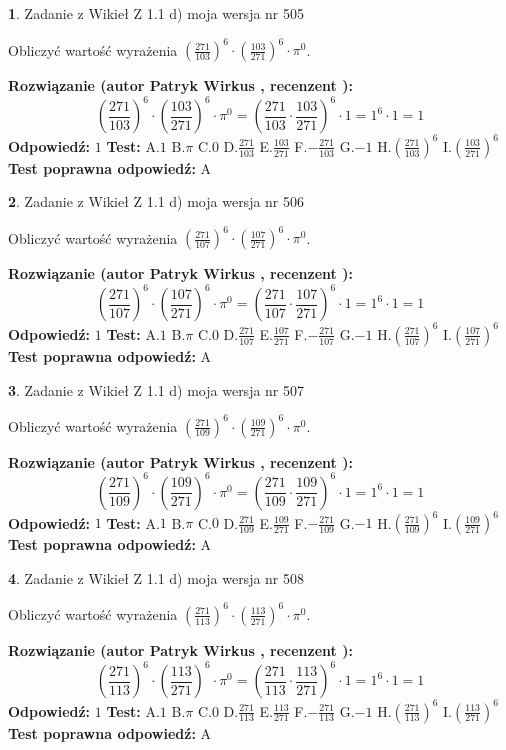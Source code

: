 \documentclass[12pt, a4paper]{article}
\theoremstyle{definition} %
\newtheorem{zad}{}
\newcommand{\zadStart}[1]{\begin{zad}#1\newline}
\newcommand{\zadStop}{\end{zad}}
\newcommand{\rozwStart}[2]{\noindent \textbf{Rozwiązanie (autor #1 , recenzent #2): }\newline}
\newcommand{\rozwStop}{\newline}
\newcommand{\odpStart}{\noindent \textbf{Odpowiedź:}\newline}
\newcommand{\odpStop}{\newline}
\newcommand{\testStart}{\noindent \textbf{Test:}\newline}
\newcommand{\testStop}{\newline}
\newcommand{\kluczStart}{\noindent \textbf{Test poprawna odpowiedź:}\newline}
\newcommand{\kluczStop}{\newline}
\begin{document}
\zadStart{Zadanie z Wikieł Z 1.1 d) moja wersja nr 505}

Obliczyć wartość wyrażenia $(\frac{271}{103})^{6} \cdot (\frac{103}{271})^{6} \cdot \pi^{0}$.
\zadStop
\rozwStart{Patryk Wirkus}{}
$$(\frac{271}{103})^{6} \cdot (\frac{103}{271})^{6} \cdot \pi^{0} = (\frac{271}{103} \cdot \frac{103}{271})^{6} \cdot 1 = 1^{6} \cdot 1 = 1$$
\rozwStop
\odpStart
$1$
\odpStop
\testStart
A.$1$ B.$\pi$ C.$0$ D.$\frac{271}{103}$ E.$\frac{103}{271}$
F.$-\frac{271}{103}$ G.$-1$
H.$(\frac{271}{103})^{6}$
I.$(\frac{103}{271})^{6}$
\testStop
\kluczStart
A
\kluczStop



\zadStart{Zadanie z Wikieł Z 1.1 d) moja wersja nr 506}

Obliczyć wartość wyrażenia $(\frac{271}{107})^{6} \cdot (\frac{107}{271})^{6} \cdot \pi^{0}$.
\zadStop
\rozwStart{Patryk Wirkus}{}
$$(\frac{271}{107})^{6} \cdot (\frac{107}{271})^{6} \cdot \pi^{0} = (\frac{271}{107} \cdot \frac{107}{271})^{6} \cdot 1 = 1^{6} \cdot 1 = 1$$
\rozwStop
\odpStart
$1$
\odpStop
\testStart
A.$1$ B.$\pi$ C.$0$ D.$\frac{271}{107}$ E.$\frac{107}{271}$
F.$-\frac{271}{107}$ G.$-1$
H.$(\frac{271}{107})^{6}$
I.$(\frac{107}{271})^{6}$
\testStop
\kluczStart
A
\kluczStop



\zadStart{Zadanie z Wikieł Z 1.1 d) moja wersja nr 507}

Obliczyć wartość wyrażenia $(\frac{271}{109})^{6} \cdot (\frac{109}{271})^{6} \cdot \pi^{0}$.
\zadStop
\rozwStart{Patryk Wirkus}{}
$$(\frac{271}{109})^{6} \cdot (\frac{109}{271})^{6} \cdot \pi^{0} = (\frac{271}{109} \cdot \frac{109}{271})^{6} \cdot 1 = 1^{6} \cdot 1 = 1$$
\rozwStop
\odpStart
$1$
\odpStop
\testStart
A.$1$ B.$\pi$ C.$0$ D.$\frac{271}{109}$ E.$\frac{109}{271}$
F.$-\frac{271}{109}$ G.$-1$
H.$(\frac{271}{109})^{6}$
I.$(\frac{109}{271})^{6}$
\testStop
\kluczStart
A
\kluczStop



\zadStart{Zadanie z Wikieł Z 1.1 d) moja wersja nr 508}

Obliczyć wartość wyrażenia $(\frac{271}{113})^{6} \cdot (\frac{113}{271})^{6} \cdot \pi^{0}$.
\zadStop
\rozwStart{Patryk Wirkus}{}
$$(\frac{271}{113})^{6} \cdot (\frac{113}{271})^{6} \cdot \pi^{0} = (\frac{271}{113} \cdot \frac{113}{271})^{6} \cdot 1 = 1^{6} \cdot 1 = 1$$
\rozwStop
\odpStart
$1$
\odpStop
\testStart
A.$1$ B.$\pi$ C.$0$ D.$\frac{271}{113}$ E.$\frac{113}{271}$
F.$-\frac{271}{113}$ G.$-1$
H.$(\frac{271}{113})^{6}$
I.$(\frac{113}{271})^{6}$
\testStop
\kluczStart
A
\kluczStop
\end{document}
